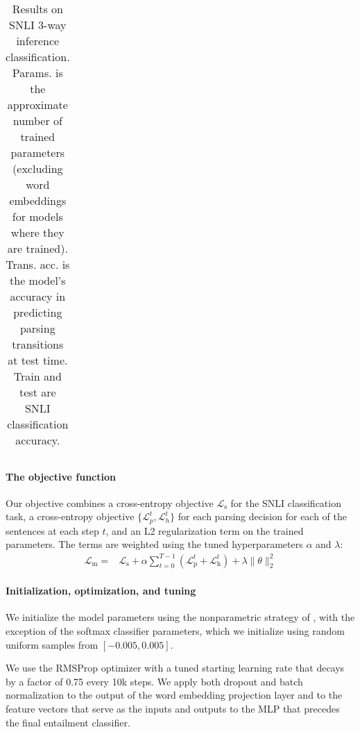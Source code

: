 \documentclass[11pt]{article}
\begin{document}
\begin{table*}[t]
\begin{tabular}{lrrrr}
    \bottomrule
  \end{tabular}
\caption{\protect\label{tab:results}Results on SNLI 3-way inference classification. Params. is the approximate number of trained parameters (excluding word embeddings for models where they are trained). Trans. acc. is the model's accuracy in predicting parsing transitions at test time. Train and test are SNLI classification accuracy.} 
\end{table*}


\paragraph{The objective function} Our objective combines a cross-entropy objective $\mathcal{L}_{\text{s}}$ for the SNLI classification task, a cross-entropy objective $\{\mathcal{L}_p^t, \mathcal{L}_h^t\}$ for each parsing decision for each of the sentences at each step $t$, and an L2 regularization term on the trained parameters. The terms are weighted using the tuned hyperparameters $\alpha$ and $\lambda$:
\begin{equation}
\begin{split}
\mathcal{L}_{\text{m}} = &\mathcal{L}_{\text{s}} + \alpha \sum_{t=0}^{T-1} (\mathcal{L}_{\text{p}}^{t} + \mathcal{L}_{\text{h}}^{t}) + \lambda \|\theta\|^2_2
\end{split}
\end{equation}

\paragraph{Initialization, optimization, and tuning}

We initialize the model parameters using the nonparametric strategy of \citet{DBLP:journals/corr/HeZR015}, with the exception of the softmax classifier parameters, which we initialize using random uniform samples from $[-0.005, 0.005]$.

We use the RMSProp optimizer \citep{tieleman2012lecture} with a tuned starting learning rate that decays by a factor of 0.75 every 10k steps. We apply both dropout \citep{srivastava2014dropout} and batch normalization \citep{2015SIoffeCSzegedy} to the output of the word embedding projection layer and to the feature vectors that serve as the inputs and outputs to the MLP that precedes the final entailment classifier.
\end{document}
